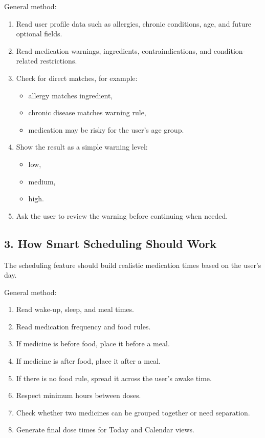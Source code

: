 \documentclass[11pt,a4paper]{article}
\begin{document}
General method:
\begin{enumerate}
    \item Read user profile data such as allergies, chronic conditions, age, and future optional fields.
    \item Read medication warnings, ingredients, contraindications, and condition-related restrictions.
    \item Check for direct matches, for example:
    \begin{itemize}
        \item allergy matches ingredient,
        \item chronic disease matches warning rule,
        \item medication may be risky for the user's age group.
    \end{itemize}
    \item Show the result as a simple warning level:
    \begin{itemize}
        \item low,
        \item medium,
        \item high.
    \end{itemize}
    \item Ask the user to review the warning before continuing when needed.
\end{enumerate}

\subsection{3. How Smart Scheduling Should Work}
The scheduling feature should build realistic medication times based on the user's day.

General method:
\begin{enumerate}
    \item Read wake-up, sleep, and meal times.
    \item Read medication frequency and food rules.
    \item If medicine is before food, place it before a meal.
    \item If medicine is after food, place it after a meal.
    \item If there is no food rule, spread it across the user's awake time.
    \item Respect minimum hours between doses.
    \item Check whether two medicines can be grouped together or need separation.
    \item Generate final dose times for Today and Calendar views.
\end{enumerate}
\end{document}
